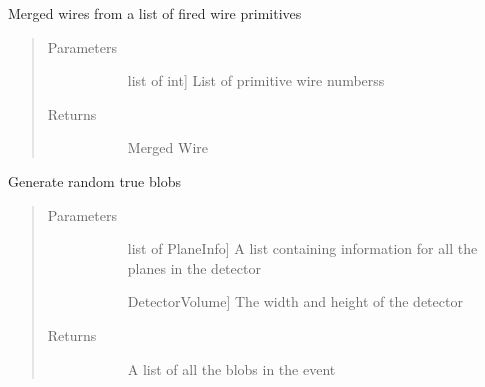 \documentclass[letterpaper,10pt,english]{sphinxmanual}
\begin{document}
\begin{fulllineitems}
\label{\detokenize{geometryGen:geometryGen.createMergedWires}}
Merged wires from a list of fired wire primitives
\begin{quote}\begin{description}
\item[{Parameters}] \leavevmode\begin{description}
\item[{}] \leavevmode{[}list of int{]}
List of primitive wire numberss

\end{description}

\item[{Returns}] \leavevmode\begin{description}
\item[{}] \leavevmode
Merged Wire

\end{description}

\end{description}\end{quote}

\end{fulllineitems}


\begin{fulllineitems}
\label{\detokenize{geometryGen:geometryGen.generateBlobs}}
Generate random true blobs
\begin{quote}\begin{description}
\item[{Parameters}] \leavevmode\begin{description}
\item[{}] \leavevmode{[}list of PlaneInfo{]}
A list containing information for all the planes in the detector

\item[{}] \leavevmode{[}DetectorVolume{]}
The width and height of the detector

\end{description}

\item[{Returns}] \leavevmode\begin{description}
\item[{}] \leavevmode
A list of all the blobs in the event

\end{description}

\end{description}\end{quote}

\end{fulllineitems}
\end{document}
